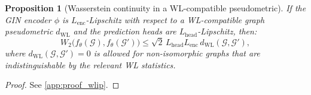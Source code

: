 \documentclass[aps,prx,reprint,superscriptaddress,longbibliography]{revtex4-2}
\newcommand{\GIN}{\textnormal{\textsc{GIN}}}
\newcommand{\calG}{\mathcal{G}}
\newtheorem{proposition}[theorem]{Proposition}
\begin{document}
\begin{proposition}[Wasserstein continuity in a WL-compatible pseudometric]
\label{prop:wasserstein_lip}
If the \GIN{} encoder $\phi$ is $L_{\mathrm{enc}}$-Lipschitz
with respect to a WL-compatible graph pseudometric $d_{\mathrm{WL}}$
and the prediction heads are $L_{\mathrm{head}}$-Lipschitz, then:
\begin{equation}
    W_2\bigl(f_\theta(\calG),f_\theta(\calG')\bigr)
    \le \sqrt{2}\, L_{\mathrm{head}} L_{\mathrm{enc}}\,
    d_{\mathrm{WL}}(\calG,\calG'),
    \label{eq:wlip}
\end{equation}
where $d_{\mathrm{WL}}(\calG,\calG')=0$ is allowed for
non-isomorphic graphs that are indistinguishable by the relevant WL
statistics.
\end{proposition}

\begin{proof}
See \cref{app:proof_wlip}.
\end{proof}
\end{document}
